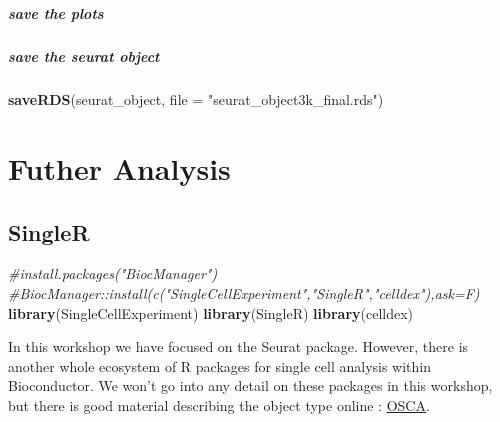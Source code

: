 \documentclass[
]{book}
\newenvironment{Shaded}{\begin{snugshade}}{\end{snugshade}}
\newcommand{\AttributeTok}[1]{\textcolor[rgb]{0.13,0.29,0.53}{#1}}
\newcommand{\CommentTok}[1]{\textcolor[rgb]{0.56,0.35,0.01}{\textit{#1}}}
\newcommand{\FunctionTok}[1]{\textcolor[rgb]{0.13,0.29,0.53}{\textbf{#1}}}
\newcommand{\NormalTok}[1]{#1}
\newcommand{\StringTok}[1]{\textcolor[rgb]{0.31,0.60,0.02}{#1}}
\begin{document}
\hypertarget{section-12}{%
\subsubsection*{}\label{section-12}}

\hypertarget{save-the-plots}{%
\subsubsection{save the plots}\label{save-the-plots}}

\hypertarget{save-the-seurat-object}{%
\subsubsection{save the seurat object}\label{save-the-seurat-object}}

\begin{Shaded}
\begin{Highlighting}[]
\FunctionTok{saveRDS}\NormalTok{(seurat\_object, }\AttributeTok{file =} \StringTok{"seurat\_object3k\_final.rds"}\NormalTok{)}
\end{Highlighting}
\end{Shaded}

\hypertarget{part-futher-analysis}{%
\part{Futher Analysis}\label{part-futher-analysis}}

\hypertarget{singler}{%
\chapter{SingleR}\label{singler}}

\begin{Shaded}
\begin{Highlighting}[]
\CommentTok{\#install.packages("BiocManager")}
\CommentTok{\#BiocManager::install(c("SingleCellExperiment","SingleR","celldex"),ask=F)}
\FunctionTok{library}\NormalTok{(SingleCellExperiment)}
\FunctionTok{library}\NormalTok{(SingleR)}
\FunctionTok{library}\NormalTok{(celldex)}
\end{Highlighting}
\end{Shaded}

In this workshop we have focused on the Seurat package. However, there is another whole ecosystem of R packages for single cell analysis within Bioconductor. We won't go into any detail on these packages in this workshop, but there is good material describing the object type online : \href{https://robertamezquita.github.io/orchestratingSingleCellAnalysis/data-infrastructure.html}{OSCA}.
\end{document}
